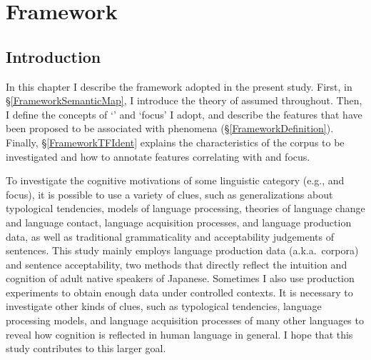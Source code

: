 \chapter{Framework}\label{Framework}


\section{Introduction}\label{FrameworkIntro}

In this chapter I describe the framework adopted in the present study.
First, in \S \ref{FrameworkSemanticMap},
I introduce the theory of  assumed throughout.
Then, I define the concepts of `' and `focus' I adopt, and describe the features
that have been proposed to be associated with  phenomena (\S \ref{FrameworkDefinition}).
Finally,
\S \ref{FrameworkTFIdent} explains the characteristics of the corpus to be investigated and how to annotate features correlating with  and focus.

To investigate the cognitive motivations of some linguistic category (e.g.,  and focus),
it is possible to use a variety of clues, such as generalizations about typological tendencies, models of language processing, theories of language change and language contact, language acquisition processes, and language production data, as well as traditional grammaticality and acceptability judgements of sentences.
This study mainly employs language production data (a.k.a.\ corpora) and
sentence acceptability, two methods that directly reflect the intuition and cognition of adult native speakers of Japanese.
Sometimes I also use production experiments to obtain enough data
under controlled contexts.
It is necessary to investigate other kinds of clues, such as typological tendencies, language processing models, and language acquisition processes of many other languages
to reveal how cognition is reflected in human language in general.
I hope that this study contributes to this larger goal.

